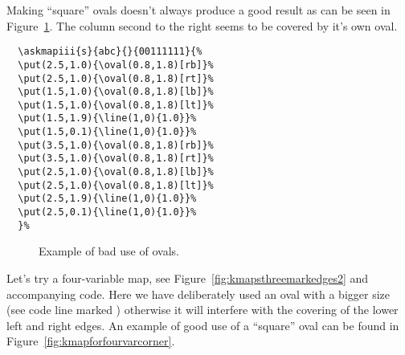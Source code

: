 \documentclass[a4paper,10pt]{ltxdoc}
\begin{document}
Making ``square'' ovals doesn't always produce a good result as can be seen
in Figure~\ref{fig:kmapsquareoval}. The column second to the right seems to
be covered by it's own oval.

\bigskip
\begin{minipage}[c]{0.5\textwidth}
\begin{verbatim}
  \askmapiii{s}{abc}{}{00111111}{%
  \put(2.5,1.0){\oval(0.8,1.8)[rb]}%
  \put(2.5,1.0){\oval(0.8,1.8)[rt]}%
  \put(1.5,1.0){\oval(0.8,1.8)[lb]}%
  \put(1.5,1.0){\oval(0.8,1.8)[lt]}%
  \put(1.5,1.9){\line(1,0){1.0}}%
  \put(1.5,0.1){\line(1,0){1.0}}%
  \put(3.5,1.0){\oval(0.8,1.8)[rb]}%
  \put(3.5,1.0){\oval(0.8,1.8)[rt]}%
  \put(2.5,1.0){\oval(0.8,1.8)[lb]}%
  \put(2.5,1.0){\oval(0.8,1.8)[lt]}%
  \put(2.5,1.9){\line(1,0){1.0}}%
  \put(2.5,0.1){\line(1,0){1.0}}%
  }%
\end{verbatim}
\end{minipage}\hfill%
\begin{minipage}[c]{0.5\textwidth}
\vspace*{-3\baselineskip}
\begin{figure}[H]
\centering
{}%
\caption{Example of bad use of ovals.}
\label{fig:kmapsquareoval}
\end{figure}
\end{minipage}
\bigskip





Let's try a four-variable map, see Figure~\ref{fig:kmapsthreemarkedges2}
and accompanying code. Here we have deliberately used an oval with a
bigger size (see code line marked \textasteriskcentered) otherwise it will
interfere with the covering of the lower left and right edges. An example
of good use of a ``square'' oval can be found in
Figure~\ref{fig:kmapforfourvarcorner}.
\end{document}
